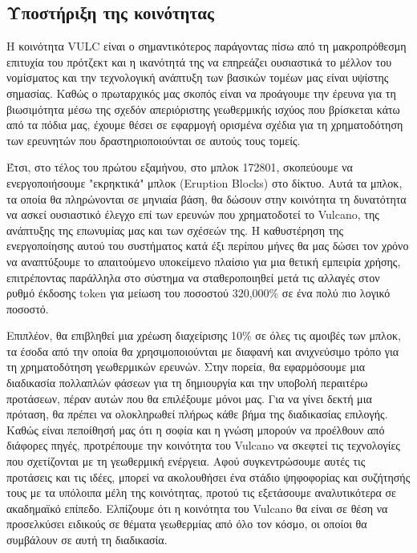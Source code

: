\documentclass[A4paper, 12pt]{article}
\begin{document}
\subsection{Υποστήριξη της κοινότητας}
Η κοινότητα VULC είναι ο σημαντικότερος παράγοντας πίσω από τη μακροπρόθεσμη επιτυχία του πρότζεκτ και η ικανότητά της να επηρεάζει ουσιαστικά το μέλλον του νομίσματος και την τεχνολογική ανάπτυξη των βασικών τομέων μας είναι υψίστης σημασίας. Καθώς ο πρωταρχικός μας σκοπός είναι να προάγουμε την έρευνα για τη βιωσιμότητα μέσω της σχεδόν απεριόριστης γεωθερμικής ισχύος που βρίσκεται κάτω από τα πόδια μας, έχουμε θέσει σε εφαρμογή ορισμένα σχέδια για τη χρηματοδότηση των ερευνητών που δραστηριοποιούνται σε αυτούς τους τομείς.

Έτσι, στο τέλος του πρώτου εξαμήνου, στο μπλοκ 172801, σκοπεύουμε να ενεργοποιήσουμε "εκρηκτικά" μπλοκ (Eruption Blocks) στο δίκτυο. Αυτά τα μπλοκ, τα οποία θα πληρώνονται σε μηνιαία βάση, θα δώσουν στην κοινότητα τη δυνατότητα να ασκεί ουσιαστικό έλεγχο επί των ερευνών που χρηματοδοτεί το Vulcano, της ανάπτυξης της επωνυμίας μας και των σχέσεών της. Η καθυστέρηση της ενεργοποίησης αυτού του συστήματος κατά έξι περίπου μήνες θα μας δώσει τον χρόνο να αναπτύξουμε το απαιτούμενο υποκείμενο πλαίσιο για μια θετική εμπειρία χρήσης, επιτρέποντας παράλληλα στο σύστημα να σταθεροποιηθεί μετά τις αλλαγές στον ρυθμό έκδοσης token για μείωση του ποσοστού 320,000\% σε ένα πολύ πιο λογικό ποσοστό.

Επιπλέον, θα επιβληθεί μια χρέωση διαχείρισης 10\% σε όλες τις αμοιβές των μπλοκ, τα έσοδα από την οποία θα χρησιμοποιούνται με διαφανή και ανιχνεύσιμο τρόπο για τη χρηματοδότηση γεωθερμικών ερευνών. Στην πορεία, θα εφαρμόσουμε μια διαδικασία πολλαπλών φάσεων για τη δημιουργία και την υποβολή περαιτέρω προτάσεων, πέραν αυτών που θα επιλέξουμε μόνοι μας. Για να γίνει δεκτή μια πρόταση, θα πρέπει να ολοκληρωθεί πλήρως κάθε βήμα της διαδικασίας επιλογής. Καθώς είναι πεποίθησή μας ότι η σοφία και η γνώση μπορούν να προέλθουν από διάφορες πηγές, προτρέπουμε την κοινότητα του Vulcano να σκεφτεί τις τεχνολογίες που σχετίζονται με τη γεωθερμική ενέργεια. Αφού συγκεντρώσουμε αυτές τις προτάσεις και τις ιδέες, μπορεί να ακολουθήσει ένα στάδιο ψηφοφορίας και συζήτησής τους με τα υπόλοιπα μέλη της κοινότητας, προτού τις εξετάσουμε αναλυτικότερα σε ακαδημαϊκό επίπεδο. Ελπίζουμε ότι η κοινότητα του Vulcano θα είναι σε θέση να προσελκύσει ειδικούς σε θέματα γεωθερμίας από όλο τον κόσμο, οι οποίοι θα συμβάλουν σε αυτή τη διαδικασία.
\end{document}

